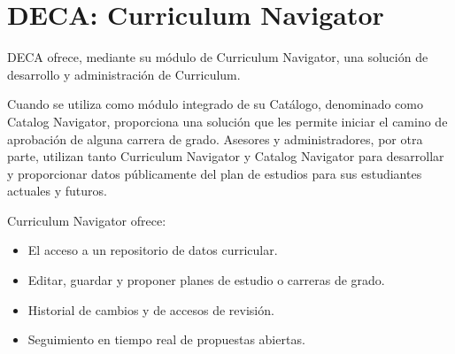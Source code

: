 \section{DECA: Curriculum Navigator}
DECA ofrece, mediante su módulo de Curriculum Navigator, una solución de desarrollo y administración de Curriculum\citep{deca_webpage}.

Cuando se utiliza como módulo integrado de su Catálogo, denominado como Catalog Navigator, proporciona una solución que les permite iniciar el camino de aprobación de alguna carrera de grado. Asesores y administradores, por otra parte, utilizan tanto Curriculum Navigator y Catalog Navigator para desarrollar y proporcionar datos públicamente del plan de estudios para sus estudiantes actuales y futuros.

Curriculum Navigator ofrece:
\begin{itemize}
	\item El acceso a un repositorio de datos curricular.
	\item Editar, guardar y proponer planes de estudio o carreras de grado.
	\item Historial de cambios y de accesos de revisión.
	\item Seguimiento en tiempo real de propuestas abiertas.
\end{itemize}